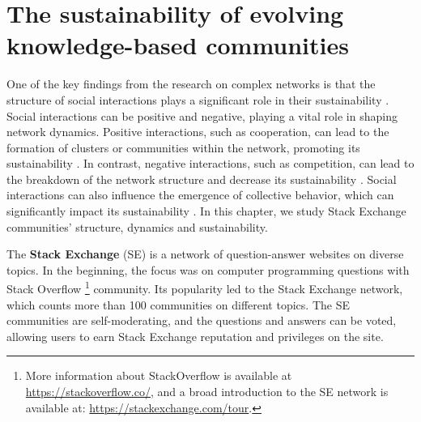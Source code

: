 
\chapter{The sustainability of evolving knowledge-based communities} %
\label{Ch:Trust}

One of the key findings from the research on complex networks is that the structure of social interactions plays a significant role in their sustainability \cite{smiljanic2017associative, torok2017cascading}. Social interactions can be positive and negative, playing a vital role in shaping network dynamics. Positive interactions, such as cooperation, can lead to the formation of clusters or communities within the network, promoting its sustainability \cite{gross2008adaptive, han2017emergence}. In contrast, negative interactions, such as competition, can lead to the breakdown of the network structure and decrease its sustainability \cite{lhorincz2019collapse, torok2017cascading}. Social interactions can also influence the emergence of collective behavior, which can significantly impact its sustainability \cite{smiljanic2017associative, torok2017cascading}. In this chapter, we study Stack Exchange communities' structure, dynamics and sustainability. 

The \textbf{Stack Exchange} (SE) is a network of question-answer websites on diverse topics. In the beginning, the focus was on computer programming questions with Stack Overflow \footnote{
	More information about StackOverflow is available at \url{https://stackoverflow.co/}, and a broad introduction to the SE network is available at: \url{https://stackexchange.com/tour}. 
}  community. Its popularity led to the Stack Exchange network, which counts more than 100 communities on different topics. The SE communities are self-moderating, and the questions and answers can be voted, allowing users to earn Stack Exchange reputation and privileges on the site. %

